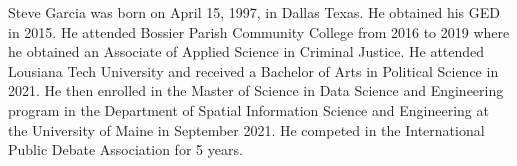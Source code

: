 \begin{biography}			%
Steve Garcia was born on April 15, 1997, in Dallas Texas. He obtained his GED in 2015. He attended Bossier Parish Community College from 2016 to 2019 where he obtained an Associate of Applied Science in Criminal Justice. He attended Lousiana Tech University and received a Bachelor of Arts in Political Science in 2021. He then enrolled in the Master of Science in Data Science and Engineering program in the Department of Spatial Information Science and Engineering at the University of Maine in September 2021. He competed in the International Public Debate Association for 5 years.

\end{biography}

\endinput